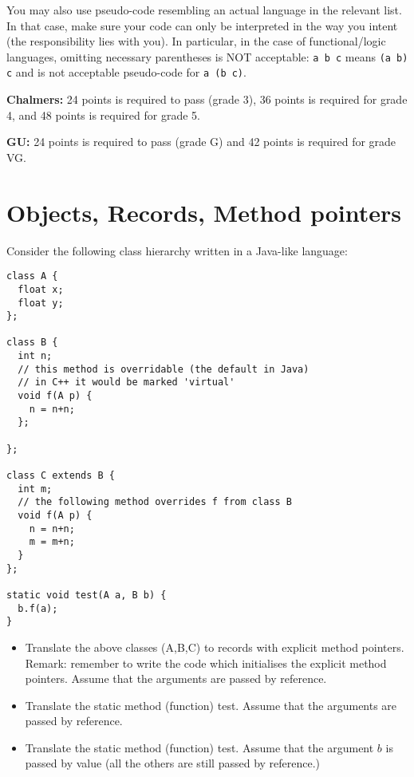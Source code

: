 \documentclass{article}
\newcommand{\answer}[1]{}
\begin{document}
You may also use pseudo-code resembling an actual language in the
relevant list. In that case, make sure your code can only be
interpreted in the way you intent (the responsibility lies with
you). In particular, in the case of functional/logic languages,
omitting necessary parentheses is NOT acceptable: \texttt{a b c} means
\texttt{(a b) c} and is not acceptable pseudo-code for \texttt{a (b
  c)}.


\textbf{Chalmers:}
24 points is required to pass (grade 3), 36 points is required for
grade 4, and 48 points is required for grade 5.

\textbf{GU:}
24 points is required to pass (grade G) and 42 points is
required for grade VG.

\section{Objects, Records, Method pointers}
Consider the following class hierarchy written in a Java-like
language:
\begin{verbatim}
class A {
  float x;
  float y;
};

class B {
  int n;
  // this method is overridable (the default in Java)
  // in C++ it would be marked 'virtual'
  void f(A p) {
    n = n+n;
  };

};

class C extends B {
  int m;
  // the following method overrides f from class B
  void f(A p) {
    n = n+n;
    m = m+n;
  }
};

static void test(A a, B b) {
  b.f(a);
}
\end{verbatim}

\begin{itemize}
\item Translate the above classes (A,B,C) to records with explicit method
  pointers.  Remark: remember to write the code which initialises the
  explicit method pointers. Assume that the arguments are passed by
  reference.  
\item Translate the static method (function) test. Assume that the
  arguments are passed by reference.  
\item Translate the static method (function) test. Assume that the
  argument $b$ is passed by value (all the others are still passed by
  reference.)  
\end{itemize}

\answer{
\begin{itemize}
\item 
\begin{verbatim}
    struct A {
      float x = 0
      float y = 0
    }
    struct B {
      int n = 0
      void* f(B* this, A* p) = B_f;
    }
    struct C {
      int n = 0
      void* f(C* this, A* p) = C_f;
      int m;
    }
\end{verbatim}
\item
\begin{verbatim}
void test(A* a, B* b) {
  b->f(b,a);
}
\end{verbatim}
\item
\begin{verbatim}
void test(A* a, B b) {
  B_f(&b,a);
}
\end{verbatim}
\end{itemize}
}
\newpage
\end{document}
